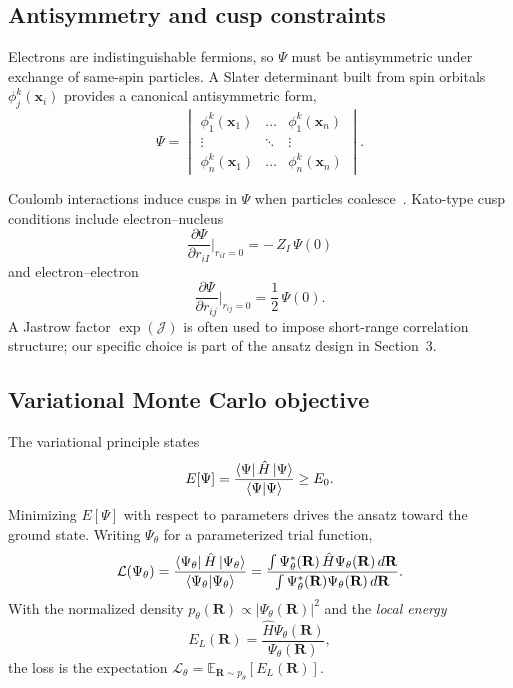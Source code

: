 \subsection{Antisymmetry and cusp constraints}

Electrons are indistinguishable fermions, so $\Psi$ must be antisymmetric under exchange of same-spin particles. A Slater determinant built from spin orbitals $\phi_j^k(\mathbf{x}_i)$ provides a canonical antisymmetric form,
\begin{equation}
	\Psi=
	\begin{vmatrix}
		\phi_{1}^{k}(\mathbf{x}_{1})  & \dots  &  \phi_{1}^{k}(\mathbf{x}_{n}) \\
		\vdots   &  \ddots  & \vdots  \\
		\phi_{n}^{k}(\mathbf{x}_{1}) & \dots & \phi_{n}^{k}(\mathbf{x}_{n})
	\end{vmatrix}.
\end{equation}

Coulomb interactions induce cusps in $\Psi$ when particles coalesce~\cite{kato}. Kato-type cusp conditions include electron--nucleus
\begin{equation*}
	\frac{\partial \Psi}{\partial r_{iI}}\Big|_{r_{iI}=0} = -\,Z_I\,\Psi(0)
\end{equation*}
and electron--electron
\begin{equation*}
	\frac{\partial \Psi}{\partial r_{ij}}\Big|_{r_{ij}=0} = \frac{1}{2}\,\Psi(0).
\end{equation*}
A Jastrow factor $\exp(\mathcal{J})$ is often used to impose short-range correlation structure; our specific choice is part of the ansatz design in Section~3.

\subsection{Variational Monte Carlo objective}

The variational principle states
\begin{equation}
	E[\Psi] = \frac{\bra{\Psi} \hat{H}\ket{\Psi}}{\braket{\Psi}{\Psi}} \ge E_0.
\end{equation}
Minimizing $E[\Psi]$ with respect to parameters drives the ansatz toward the ground state. Writing $\Psi_\theta$ for a parameterized trial function,
\begin{equation}
	\mathcal{L}(\Psi_\theta)
	=\frac{\bra{\Psi_{\theta}} \hat{H}\ket{\Psi_{\theta}}}{\braket{\Psi_{\theta}}{\Psi_{\theta}}}
	=\frac{\int \Psi_\theta^*(\mathbf{R})\,\hat{H}\Psi_\theta(\mathbf{R})\,d\mathbf{R}}{\int \Psi_\theta^*(\mathbf{R})\Psi_\theta(\mathbf{R})\,d\mathbf{R}}.
\end{equation}
With the normalized density $p_\theta(\mathbf{R})\propto|\Psi_\theta(\mathbf{R})|^2$ and the \emph{local energy}
\begin{equation}
	E_L(\mathbf{R})=\frac{\hat{H}\Psi_\theta(\mathbf{R})}{\Psi_\theta(\mathbf{R})},
\end{equation}
the loss is the expectation $\mathcal{L}_\theta=\mathbb{E}_{\mathbf{R}\sim p_\theta}[E_L(\mathbf{R})]$.

